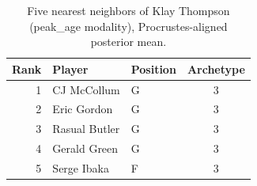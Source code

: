 \begin{table}[htbp]
  \centering\small
  \begin{tabular}{rllc}
    \toprule
    Rank & Player & Position & Archetype \\
    \midrule
    1 & CJ McCollum & G & 3 \\
    2 & Eric Gordon & G & 3 \\
    3 & Rasual Butler & G & 3 \\
    4 & Gerald Green & G & 3 \\
    5 & Serge Ibaka & F & 3 \\
    \bottomrule
  \end{tabular}
  \caption{Five nearest neighbors of Klay Thompson (peak_age modality), Procrustes-aligned posterior mean.}
  \label{tab:Klay_Thompson_neighbors_peak_age}
\end{table}

